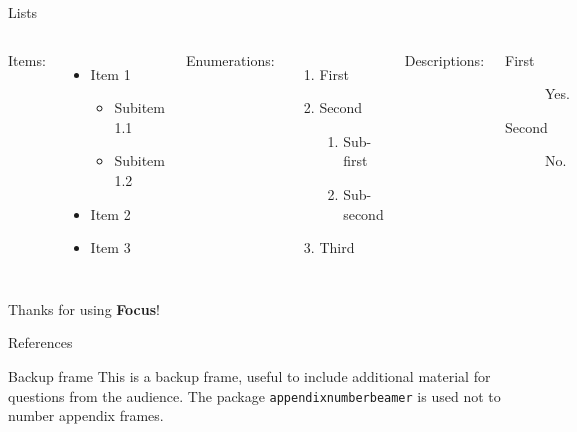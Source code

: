 \documentclass{beamer}
\begin{document}
    \begin{frame}{Lists}
        \begin{columns}[t, onlytextwidth]
                Items:
                \begin{itemize}
                    \item Item 1
                    \begin{itemize}
                        \item Subitem 1.1
                        \item Subitem 1.2
                    \end{itemize}
                    \item Item 2
                    \item Item 3
                \end{itemize}

                Enumerations:
                \begin{enumerate}
                    \item First
                    \item Second
                    \begin{enumerate}
                        \item Sub-first
                        \item Sub-second
                    \end{enumerate}
                    \item Third
                \end{enumerate}

                Descriptions:
                \begin{description}
                    \item[First] Yes.
                    \item[Second] No.
                \end{description}
        \end{columns}
    \end{frame}

    \begin{frame}[focus]
        Thanks for using \textbf{Focus}!
    \end{frame}

    \appendix
    \begin{frame}{References}
        \nocite{*}
        
        
    \end{frame}

    \begin{frame}{Backup frame}
        This is a backup frame, useful to include additional material for questions from the audience.
        \vfill
        The package \texttt{appendixnumberbeamer} is used not to number appendix frames.
    \end{frame}
\end{document}
